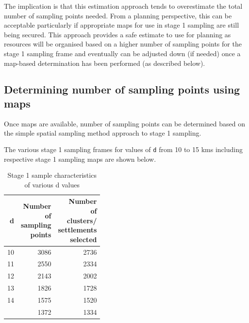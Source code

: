 \documentclass[
  12pt,
  a4paper]{article}
\begin{document}
The implication is that this estimation approach tends to overestimate the total number of sampling points needed. From a planning perspective, this can be acceptable particularly if appropriate maps for use in stage 1 sampling are still being secured. This approach provides a safe estimate to use for planning as resources will be organised based on a higher number of sampling points for the stage 1 sampling frame and eventually can be adjusted down (if needed) once a map-based determination has been performed (as described below).

\hypertarget{determining-number-of-sampling-points-using-maps}{%
\subsection{Determining number of sampling points using maps}\label{determining-number-of-sampling-points-using-maps}}

Once maps are available, number of sampling points can be determined based on the simple spatial sampling method approach to stage 1 sampling.

The various stage 1 sampling frames for values of \texttt{d} from 10 to 15 kms including respective stage 1 sampling maps are shown below.

\begin{table}[H]

\caption{\label{tab:stage1table}Stage 1 sample characteristics of various d values}
\centering
\begin{tabular}[t]{rrr}
\toprule
d & \makecell[c]{Number\\of\\sampling\\points} & \makecell[c]{Number\\of\\clusters/\\settlements\\selected}\\
\midrule
\rowcolor{gray!6}  10 & 3086 & 2736\\
11 & 2550 & 2334\\
\rowcolor{gray!6}  12 & 2143 & 2002\\
13 & 1826 & 1728\\
\rowcolor{gray!6}  14 & 1575 & 1520\\
\addlinespace
15 & 1372 & 1334\\
\bottomrule
\end{tabular}
\end{table}
\end{document}
